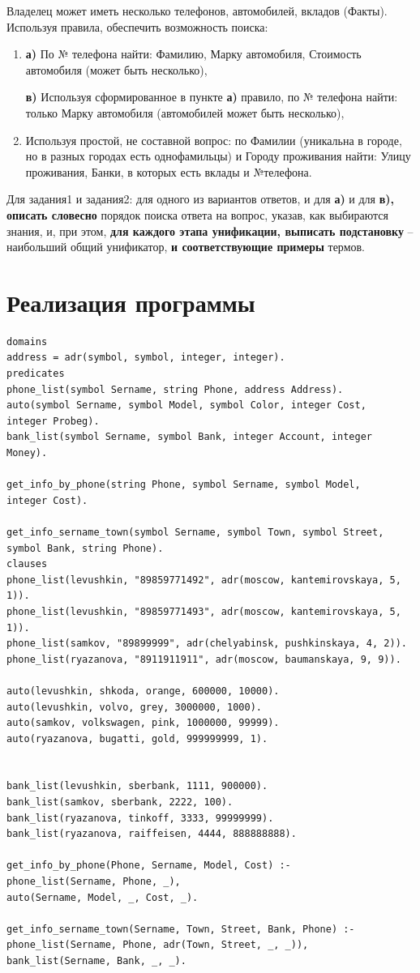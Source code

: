 \documentclass[a4paper,12pt]{article}
\begin{document}
	Владелец может иметь несколько телефонов, автомобилей, вкладов (Факты).
	Используя правила, обеспечить возможность поиска:
	\begin{enumerate}
		\item {\bf а)} По № телефона найти: Фамилию, Марку автомобиля, Стоимость автомобиля (может быть несколько),
		
		{\bf в)} Используя сформированное в пункте {\bf а)} правило, по № телефона найти: только Марку автомобиля (автомобилей может быть несколько),
		\item Используя простой, не составной вопрос: по Фамилии (уникальна в городе, но в разных городах есть однофамильцы) и Городу проживания найти:  Улицу проживания, Банки, в которых есть вклады и №телефона.
	\end{enumerate}

	Для задания1 и задания2: 
	для одного из вариантов ответов, и для {\bf а)} и для {\bf в), описать словесно} порядок поиска ответа на вопрос, указав, как выбираются знания, и, при этом, {\bf для каждого этапа унификации, выписать подстановку} – наибольший общий унификатор, {\bf и соответствующие примеры} термов.
	
	\newpage
	
	\section*{Реализация программы}
	
	\begin{verbatim}
domains
address = adr(symbol, symbol, integer, integer).
predicates
phone_list(symbol Sername, string Phone, address Address).
auto(symbol Sername, symbol Model, symbol Color, integer Cost, 
integer Probeg).
bank_list(symbol Sername, symbol Bank, integer Account, integer Money).

get_info_by_phone(string Phone, symbol Sername, symbol Model, 
integer Cost).

get_info_sername_town(symbol Sername, symbol Town, symbol Street, 
symbol Bank, string Phone).
clauses
phone_list(levushkin, "89859771492", adr(moscow, kantemirovskaya, 5, 1)).
phone_list(levushkin, "89859771493", adr(moscow, kantemirovskaya, 5, 1)).
phone_list(samkov, "89899999", adr(chelyabinsk, pushkinskaya, 4, 2)).
phone_list(ryazanova, "8911911911", adr(moscow, baumanskaya, 9, 9)).

auto(levushkin, shkoda, orange, 600000, 10000).
auto(levushkin, volvo, grey, 3000000, 1000).
auto(samkov, volkswagen, pink, 1000000, 99999).
auto(ryazanova, bugatti, gold, 999999999, 1).


bank_list(levushkin, sberbank, 1111, 900000).
bank_list(samkov, sberbank, 2222, 100).
bank_list(ryazanova, tinkoff, 3333, 99999999).
bank_list(ryazanova, raiffeisen, 4444, 888888888).

get_info_by_phone(Phone, Sername, Model, Cost) :- 
phone_list(Sername, Phone, _),
auto(Sername, Model, _, Cost, _).

get_info_sername_town(Sername, Town, Street, Bank, Phone) :- 
phone_list(Sername, Phone, adr(Town, Street, _, _)),
bank_list(Sername, Bank, _, _).
	\end{verbatim}
	
\end{document}
